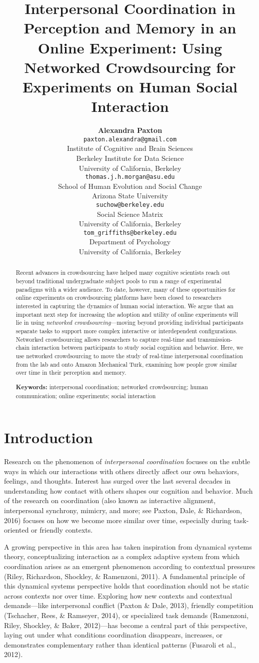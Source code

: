 \documentclass[10pt, letterpaper]{article}
\title{Interpersonal Coordination in Perception and Memory in an Online
Experiment: Using Networked Crowdsourcing for Experiments on Human
Social Interaction}
\author{{\large \bf Alexandra Paxton} \\ \texttt{paxton.alexandra@gmail.com} \\ Institute of Cognitive and Brain Sciences \\ Berkeley Institute for Data Science \\ University of California, Berkeley \And {\large \bf Thomas J. H. Morgan} \\ \texttt{thomas.j.h.morgan@asu.edu} \\ School of Human Evolution and Social Change \\ Arizona State University \AND {\large \bf Jordan W. Suchow} \\ \texttt{suchow@berkeley.edu} \\ Social Science Matrix \\ University of California, Berkeley \And {\large \bf Thomas L. Griffiths} \\ \texttt{tom\_griffiths@berkeley.edu} \\ Department of Psychology \\ University of California, Berkeley}
\begin{document}
\maketitle

\begin{abstract}
Recent advances in crowdsourcing have helped many cognitive scientists
reach out beyond traditional undergraduate subject pools to run a range
of experimental paradigms with a wider audience. To date, however, many
of these opportunities for online experiments on crowdsourcing platforms
have been closed to researchers interested in capturing the dynamics of
human social interaction. We argue that an important next step for
increasing the adoption and utility of online experiments will lie in
using \emph{networked crowdsourcing}---moving beyond providing
individual participants separate tasks to support more complex
interactive or interdependent configurations. Networked crowdsourcing
allows researchers to capture real-time and transmission-chain
interaction between participants to study social cognition and behavior.
Here, we use networked crowdsourcing to move the study of real-time
interpersonal coordination from the lab and onto Amazon Mechanical Turk,
examining how people grow similar over time in their perception and
memory.

\textbf{Keywords:}
interpersonal coordination; networked crowdsourcing; human
communication; online experiments; social interaction
\end{abstract}

\section{Introduction}\label{introduction}

Research on the phenomenon of \emph{interpersonal coordination} focuses
on the subtle ways in which our interactions with others directly affect
our own behaviors, feelings, and thoughts. Interest has surged over the
last several decades in understanding how contact with others shapes our
cognition and behavior. Much of the research on coordination (also known
as interactive alignment, interpersonal synchrony, mimicry, and more;
see Paxton, Dale, \& Richardson, 2016) focuses on how we become more
similar over time, especially during task-oriented or friendly contexts.

A growing perspective in this area has taken inspiration from dynamical
systems theory, conceptualizing interaction as a complex adaptive system
from which coordination arises as an emergent phenomenon according to
contextual pressures (Riley, Richardson, Shockley, \& Ramenzoni, 2011).
A fundamental principle of this dynamical systems perspective holds that
coordination should not be static across contexts nor over time.
Exploring how new contexts and contextual demands---like interpersonal
conflict (Paxton \& Dale, 2013), friendly competition (Tschacher, Rees,
\& Ramseyer, 2014), or specialized task demands (Ramenzoni, Riley,
Shockley, \& Baker, 2012)---has become a central part of this
perspective, laying out under what conditions coordination disappears,
increases, or demonstrates complementary rather than identical patterns
(Fusaroli et al., 2012).
\end{document}
